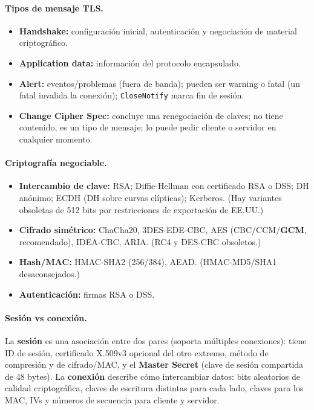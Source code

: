 \documentclass[../main.tex]{subfiles}
\begin{document}
\paragraph{Tipos de mensaje TLS.}
\begin{itemize}[leftmargin=1.4em]
  \item \textbf{Handshake:} configuración inicial, autenticación y negociación de
  material criptográfico.
  \item \textbf{Application data:} información del protocolo encapsulado.
  \item \textbf{Alert:} eventos/problemas (fuera de banda); pueden ser warning o
  fatal (un fatal invalida la conexión); \texttt{CloseNotify} marca fin de sesión.
  \item \textbf{Change Cipher Spec:} concluye una renegociación de claves; no tiene
  contenido, es un tipo de mensaje; lo puede pedir cliente o servidor en cualquier
  momento.
\end{itemize}

\paragraph{Criptografía negociable.}
\begin{itemize}[leftmargin=1.4em]
  \item \textbf{Intercambio de clave:} RSA; Diffie-Hellman con certificado RSA o DSS;
  DH anónimo; ECDH (DH sobre curvas elípticas); Kerberos. (Hay variantes obsoletas de
  512 bits por restricciones de exportación de EE.UU.)
  \item \textbf{Cifrado simétrico:} ChaCha20, 3DES-EDE-CBC, AES (CBC/CCM/\textbf{GCM},
  recomendado), IDEA-CBC, ARIA. (RC4 y DES-CBC obsoletos.)
  \item \textbf{Hash/MAC:} HMAC-SHA2 (256/384), AEAD. (HMAC-MD5/SHA1 desaconsejados.)
  \item \textbf{Autenticación:} firmas RSA o DSS.
\end{itemize}

\paragraph{Sesión vs conexión.} La \textbf{sesión} es una asociación entre dos pares
(soporta múltiples conexiones): tiene ID de sesión, certificado X.509v3 opcional del
otro extremo, método de compresión y de cifrado/MAC, y el \textbf{Master Secret}
(clave de sesión compartida de 48 bytes). La \textbf{conexión} describe cómo
intercambiar datos: bits aleatorios de calidad criptográfica, claves de escritura
distintas para cada lado, claves para los MAC, IVs y números de secuencia para
cliente y servidor.
\end{document}
